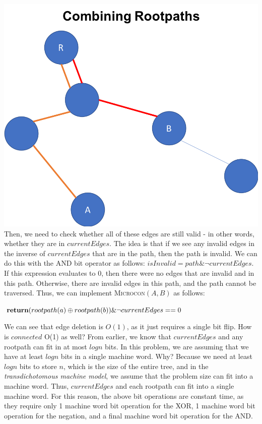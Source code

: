 \documentclass{article}
\begin{document}
\includegraphics[scale=0.6]{rootpaths.png}\\

Then, we need to check whether all of these edges are still valid - in other words, whether they are in $currentEdges$.  The idea is that if we see any invalid edges in the inverse of $currentEdges$ that are in the path, then the path is invalid.  We can do this with the AND bit operator as follows: $isInvalid = path \& \neg currentEdges$.  If this expression evaluates to 0, then there were no edges that are invalid and in this path.  Otherwise, there are invalid edges in this path, and the path cannot be traversed.  Thus, we can implement \textsc{Microcon}$(A, B)$ as follows:

\begin{algorithmic}
        \State $\Return (rootpath(a) \oplus rootpath(b)) \& \neg currentEdges == 0$
    \EndProcedure
\end{algorithmic}

We can see that edge deletion is $O(1)$, as it just requires a single bit flip.  How is $connected$ O(1) as well?  From earlier, we know that $currentEdges$ and any rootpath can fit in at most $log n$ bits.  In this problem, we are assuming that we have at least $log n$ bits in a single machine word.  Why?  Because we need at least $log n$ bits to store $n$, which is the size of the entire tree, and in the \textit{transdichotomous machine model}, we assume that the problem size can fit into a machine word.  Thus, $currentEdges$ and each rootpath can fit into a single machine word.  For this reason, the above bit operations are constant time, as they require only 1 machine word bit operation for the XOR, 1 machine word bit operation for the negation, and a final machine word bit operation for the AND.
\end{document}
